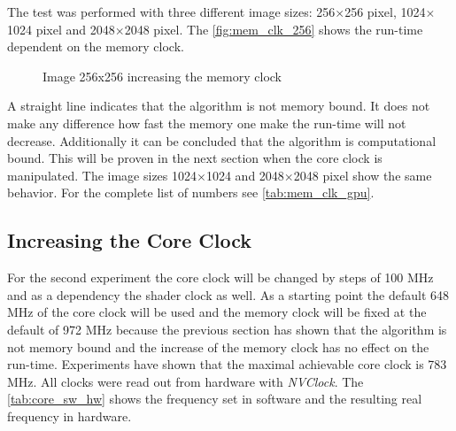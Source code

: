 The test was performed with three different image sizes: 256$\times$256 pixel, 
1024$\times$1024 pixel and 2048$\times$2048 pixel. The \autoref{fig:mem_clk_256}
shows the run-time dependent on the memory clock.

\begin{figure}[ht]
  \centering


  \tableA

 \label{fig:mem_clk_256}%
 \caption{Image 256x256 increasing the memory clock}
\end{figure}

A straight line indicates that the algorithm is not memory bound. It does not
make any difference how fast the memory one make the run-time will not decrease. 
Additionally it can be concluded that the algorithm is computational bound. This
will be proven in the next section when the core clock is manipulated. The image
sizes 1024$\times$1024 and 2048$\times$2048 pixel show the same behavior. For 
the complete list of numbers see \autoref{tab:mem_clk_gpu}.


\subsection{Increasing the Core Clock} %
\label{sub:increasing_the_core_clock}
For the second experiment the core clock will be changed by steps of 100
\gls{MHz} and as a dependency the shader clock as well. As a starting point the
default 648 \gls{MHz} of the core clock will be used and the memory clock will
be fixed at the default of 972 \gls{MHz} because the previous section has shown
that the algorithm is not memory bound and the increase of the memory clock has
no effect on the run-time. Experiments have shown that the maximal achievable
core clock is 783 \gls{MHz}. All clocks were read out from hardware with
\emph{NVClock}. The \autoref{tab:core_sw_hw} shows the frequency set in software
and the resulting real frequency in hardware.

